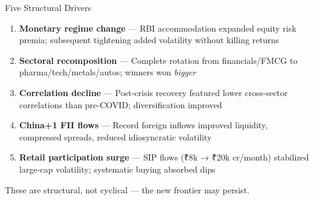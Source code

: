 \documentclass[aspectratio=169]{beamer}
\begin{document}
\begin{frame}{Five Structural Drivers}
  \small
  \begin{enumerate}
    \item \textbf{Monetary regime change} --- RBI accommodation expanded equity risk premia; subsequent tightening added volatility without killing returns
    \vspace{0.3em}
    
    \item \textbf{Sectoral recomposition} --- Complete rotation from financials/FMCG to pharma/tech/metals/autos; winners won \emph{bigger}
    \vspace{0.3em}
    
    \item \textbf{Correlation decline} --- Post-crisis recovery featured \alert{lower} cross-sector correlations than pre-COVID; diversification improved
    \vspace{0.3em}
    
    \item \textbf{China+1 FII flows} --- Record foreign inflows improved liquidity, compressed spreads, reduced idiosyncratic volatility
    \vspace{0.3em}
    
    \item \textbf{Retail participation surge} --- SIP flows (₹8k → ₹20k cr/month) stabilized large-cap volatility; systematic buying absorbed dips
  \end{enumerate}
  
  \vspace{0.5em}
  \centering
  \alert{These are structural, not cyclical} --- the new frontier may persist.
\end{frame}
\end{document}
